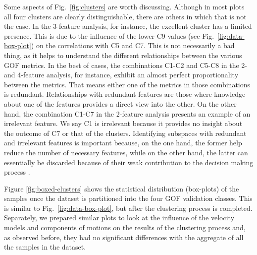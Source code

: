 Some aspects of Fig.~\ref{fig:clusters} are worth discussing. Although in most plots all four clusters are clearly distinguishable, there are others in which that is not the case. In  the 3-feature analysis, for instance, the excellent cluster has a limited presence. This is due to the influence of the lower C9 values (see Fig.~\ref{fig:data-box-plot}) on the correlations with C5 and C7. This is not necessarily a bad thing, as it helps to understand the different relationships between the various GOF metrics. In the best of cases, the combinations C1-C2 and C5-C8 in the 2- and 4-feature analysis, for instance, exhibit an almost perfect proportionality between the metrics. That means either one of the metrics in those combinations is redundant. Relationships with redundant features are those where knowledge about one of the features provides a direct view into the other. On the other hand, the combination C1-C7 in the 2-feature analysis presents an example of an irrelevant feature. We say C1 is irrelevant because it provides no insight about the outcome of C7 or that of the clusters. Identifying subspaces with redundant and irrelevant features is important because, on the one hand, the former help reduce the number of necessary features, while on the other hand, the latter can essentially be discarded because of their weak contribution to the decision making process \citep{Dy_2004_MLR}.

Figure \ref{fig:boxed-clusters} shows the statistical distribution (box-plots) of the samples once the dataset is partitioned into the four GOF validation classes. This is similar to Fig.~\ref{fig:data-box-plot}, but after the clustering process is completed. Separately, we prepared similar plots to look at the influence of the velocity models and components of motions on the results of the clustering process and, as observed before, they had no significant differences with the aggregate of all the samples in the dataset. 

